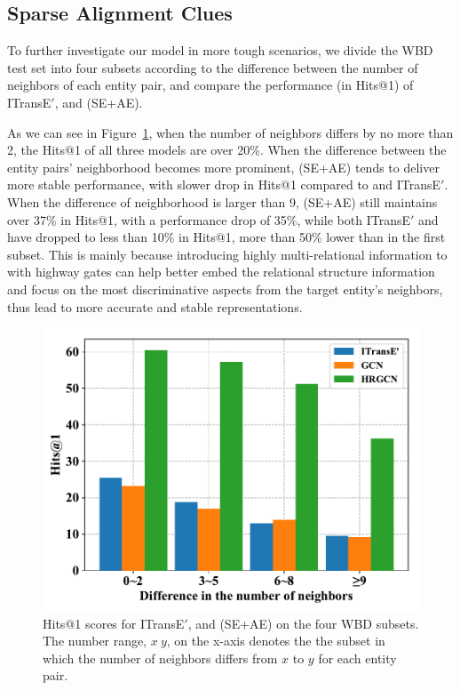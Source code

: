 \subsection{Sparse Alignment Clues}
To further investigate our model in more tough scenarios, %
we divide the WBD test set into four subsets according to the difference between the number of neighbors of each entity pair, and compare the performance (in Hits@1) of ITransE$'$, \GCN and \HRGCN (SE+AE). %

As we can see in Figure~\ref{subset}, when the number of neighbors differs by no more than 2, the Hits@1 of all three models are over 20\%.
When the difference between the entity pairs' neighborhood becomes more prominent,
\HRGCN (SE+AE) tends to deliver more stable performance, with slower drop in Hits@1 compared to \GCN and ITransE$'$.
When the difference of neighborhood is larger than 9, \HRGCN (SE+AE) still maintains over 37\% in Hits@1, with a performance drop of 35\%, while both ITransE$'$ and \GCN have dropped to less than 10\% in Hits@1, more than 50\% lower than in the first subset.
This is mainly because introducing highly multi-relational information to \GCN with highway gates can help better embed the relational structure information and focus on the most discriminative aspects from the target entity's neighbors, thus lead to more accurate and stable representations.
\begin{figure}
	\centering
	\includegraphics[width=1\linewidth]{figures/graph4.pdf}
	\caption{Hits@1 scores for ITransE$'$, \GCN and \HRGCN (SE+AE) on the four WBD subsets. The number range, $x~y$, on the
x-axis denotes the the subset in which the number of neighbors differs from $x$ to $y$ for each entity pair.}
	\label{subset}
\end{figure}

